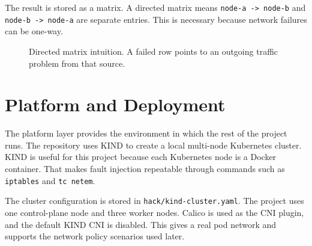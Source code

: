 \documentclass[11pt,a4paper]{article}
\newcommand{\code}[1]{\texttt{#1}}
\begin{document}
The result is stored as a matrix. A directed matrix means \code{node-a -> node-b} and \code{node-b -> node-a} are separate entries. This is necessary because network failures can be one-way.

\begin{figure}[h]
\centering
{}
\caption{Directed matrix intuition. A failed row points to an outgoing traffic problem from that source.}
\label{fig:matrix}
\end{figure}

\section{Platform and Deployment}

The platform layer provides the environment in which the rest of the project runs. The repository uses KIND to create a local multi-node Kubernetes cluster. KIND is useful for this project because each Kubernetes node is a Docker container. That makes fault injection repeatable through commands such as \code{iptables} and \code{tc netem}.

The cluster configuration is stored in \code{hack/kind-cluster.yaml}. The project uses one control-plane node and three worker nodes. Calico is used as the CNI plugin, and the default KIND CNI is disabled. This gives a real pod network and supports the network policy scenarios used later.
\end{document}
